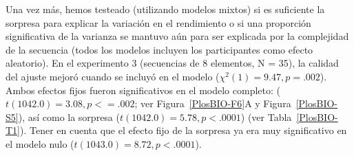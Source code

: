 Una vez más, hemos testeado (utilizando modelos mixtos) si es suficiente la sorpresa para explicar la variación en el rendimiento o si una proporción significativa de la varianza se mantuvo aún para ser explicada por la complejidad de la secuencia (todos los modelos incluyen los participantes como efecto aleatorio). En el experimento 3 (secuencias de 8 elementos, N = 35), la calidad del ajuste mejoró cuando se incluyó \mdlbin en el modelo ($\chi^2(1) = 9.47, p= .002$). Ambos efectos fijos fueron significativos en el modelo completo: \mdlbin ($t (1042.0) = 3.08, p <= .002$; ver Figura~\ref{PlosBIO-F6}A y Figura~\ref{PlosBIO-S5}), así como la sorpresa ($t (1042.0) = 5.78, p < .0001$) (ver Tabla~\ref{PlosBIO-T1}). Tener en cuenta que el efecto fijo de la sorpresa ya era muy significativo en el modelo nulo ($t (1043.0) = 8.72, p < .0001$).



